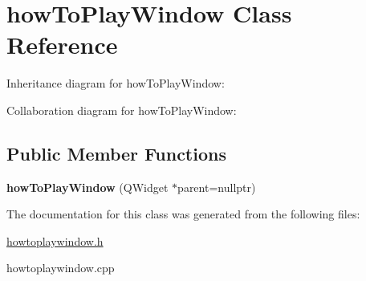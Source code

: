 \hypertarget{classhowToPlayWindow}{}\section{how\+To\+Play\+Window Class Reference}
\label{classhowToPlayWindow}


Inheritance diagram for how\+To\+Play\+Window\+:


Collaboration diagram for how\+To\+Play\+Window\+:
\subsection*{Public Member Functions}
\begin{DoxyCompactItemize}
\item 
\mbox{\label{classhowToPlayWindow_afc478552c5c713c869eccc8a74299e45}} 
{\bfseries how\+To\+Play\+Window} (Q\+Widget $\ast$parent=nullptr)
\end{DoxyCompactItemize}


The documentation for this class was generated from the following files\+:\begin{DoxyCompactItemize}
\item 
\hyperlink{howtoplaywindow_8h}{howtoplaywindow.\+h}\item 
howtoplaywindow.\+cpp\end{DoxyCompactItemize}
